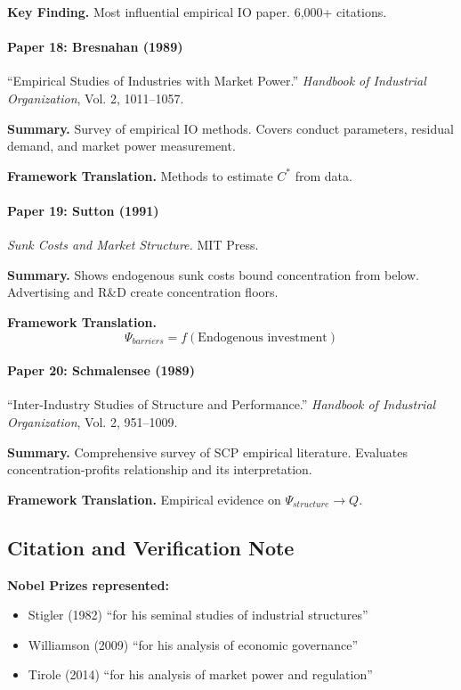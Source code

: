 \textbf{Key Finding.}
Most influential empirical IO paper. 6,000+ citations.

\paragraph{Paper 18: Bresnahan (1989)}

``Empirical Studies of Industries with Market Power.''
\textit{Handbook of Industrial Organization}, Vol. 2, 1011--1057.

\textbf{Summary.}
Survey of empirical IO methods. Covers conduct parameters, residual demand, 
and market power measurement.

\textbf{Framework Translation.}
Methods to estimate $C^*$ from data.

\paragraph{Paper 19: Sutton (1991)}

\textit{Sunk Costs and Market Structure.}
MIT Press.

\textbf{Summary.}
Shows endogenous sunk costs bound concentration from below. Advertising 
and R\&D create concentration floors.

\textbf{Framework Translation.}
\begin{equation}
\Psi_{barriers} = f(\text{Endogenous investment})
\end{equation}

\paragraph{Paper 20: Schmalensee (1989)}

``Inter-Industry Studies of Structure and Performance.''
\textit{Handbook of Industrial Organization}, Vol. 2, 951--1009.

\textbf{Summary.}
Comprehensive survey of SCP empirical literature. Evaluates concentration-profits 
relationship and its interpretation.

\textbf{Framework Translation.}
Empirical evidence on $\Psi_{structure} \to Q$.

\subsection{Citation and Verification Note}

\textbf{Nobel Prizes represented:}
\begin{itemize}
    \item Stigler (1982) ``for his seminal studies of industrial structures''
    \item Williamson (2009) ``for his analysis of economic governance''
    \item Tirole (2014) ``for his analysis of market power and regulation''
\end{itemize}

